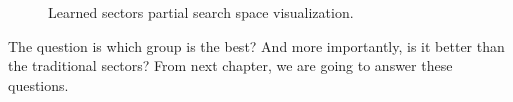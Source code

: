 \documentclass[../main.tex]{subfiles}
\begin{document}
\begin{figure}[h!]
    \centering
    \caption{Learned sectors partial search space visualization.}
    \label{fig:hierarchical_clustering_model:partial_search_space}
\end{figure}

The question is which group is the best? And more importantly, is it better than the traditional sectors? From next chapter, we are going to answer these questions.
\end{document}

